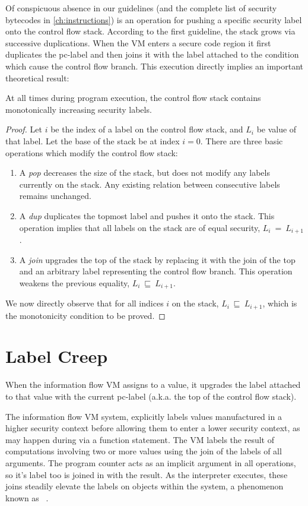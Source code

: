 Of conspicuous absence in our guidelines (and the complete list of security bytecodes in \autoref{ch:instructions}) is an operation for pushing a specific security label onto the control flow stack.
According to the first guideline, the stack grows via successive duplications.
When the VM enters a secure code region it first duplicates the pc-label and then joins it with the label attached to the condition which cause the control flow branch.
This execution directly implies an important theoretical result:
\begin{theorem}
  At all times during program execution, the control flow stack contains monotonically increasing security labels.
\end{theorem}
\begin{proof}
 Let $i$ be the index of a label on the control flow stack, and $L_i$ be value of that label.
 Let the base of the stack be at index $i=0$.
 There are three basic operations which modify the control flow stack:
 \begin{enumerate}
  \item A \textit{pop} decreases the size of the stack, but does not modify any labels currently on the stack. Any existing relation between consecutive labels remains unchanged.
  \item A \textit{dup} duplicates the topmost label and pushes it onto the stack. This operation implies that all labels on the stack are of equal security, $L_i~=~L_{i+1}$.
  \item A \textit{join} upgrades the top of the stack by replacing it with the join of the top and an arbitrary label representing the control flow branch. This operation weakens the previous equality, $L_i~\sqsubseteq~L_{i+1}$.
 \end{enumerate}
 We now directly observe that for all indices $i$ on the stack, $L_i~\sqsubseteq~L_{i+1}$, which is the monotonicity condition to be proved.
\end{proof}

\section{Label Creep}
When the information flow VM assigns to a value, it upgrades the label attached to that value with the current pc-label (a.k.a. the top of the control flow stack).

The information flow VM system, explicitly labels values manufactured in a higher security context before allowing them to enter a lower security context, as may happen during via a function  statement.
The VM labels the result of computations involving two or more values using the join of the labels of all arguments.
The program counter acts as an implicit argument in all operations, so it's label too is joined in with the result.
As the interpreter executes, these joins steadily elevate the labels on objects within the system, a phenomenon known as ~\cite{sabelfeld.myers+03}.

